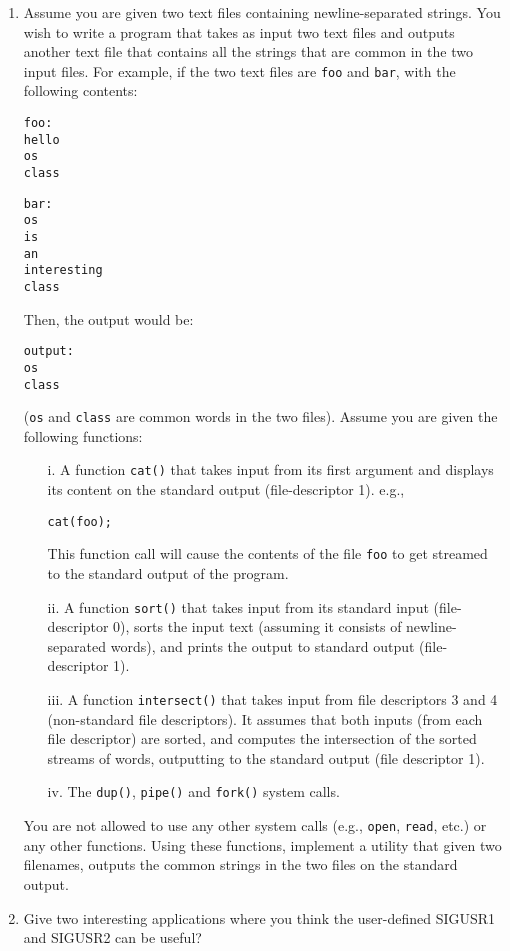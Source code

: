\begin{enumerate}
\item Assume you are given two text files containing newline-separated strings. You wish to write
a program that takes as input two text files and outputs another text file that contains all the
strings that are common in the two input files. For example, if the two text files are {\tt foo}
and {\tt bar}, with the following contents:
\begin{verbatim}
foo:
hello
os
class
\end{verbatim}
\begin{verbatim}
bar:
os
is
an
interesting
class
\end{verbatim}
Then, the output would be:
\begin{verbatim}
output:
os
class
\end{verbatim}
({\tt os} and {\tt class} are common words in the two files). Assume you are given the following
functions:
\begin{enumerate}
\item[i.] A function {\tt cat()} that takes input from its first argument and displays its
content on the standard output (file-descriptor 1). e.g.,
\begin{verbatim}
cat(foo);
\end{verbatim}
This function call will cause the contents of the file {\tt foo} to get streamed to the standard
output of the program.
\item[ii.] A function {\tt sort()} that takes input from its standard input (file-descriptor 0),
sorts the input text (assuming it consists of newline-separated words), and prints the output
to standard output (file-descriptor 1).
\item[iii.] A function {\tt intersect()} that takes input from file descriptors 3 and 4 (non-standard
file descriptors). It assumes that both inputs (from each file descriptor) are sorted, and computes
the intersection of the sorted streams of words, outputting to the standard output (file descriptor 1).
\item[iv.] The {\tt dup()}, {\tt pipe()} and {\tt fork()} system calls.
\end{enumerate}
You are not allowed to use any other system calls (e.g., {\tt open}, {\tt read}, etc.) or any
other functions. Using these functions, implement a utility that given two filenames, outputs
the common strings in the two files on the standard output.

\item Give two interesting applications where you think the user-defined SIGUSR1 and
SIGUSR2 can be useful?


\end{enumerate}
